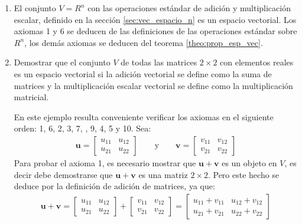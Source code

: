\documentclass[a4paper,12pt]{article}
\begin{document}
\begin{enumerate}[\textsc{Ejemplo} 1:, wide=\parindent]
  \item El conjunto $V=R^n$ con las operaciones estándar de adición y
    multiplicación escalar, definido en la sección \ref{sec:vec_espacio_n} es
    un espacio vectorial. Los axiomas 1 y 6 se deducen de las definiciones de
    las operaciones estándar sobre $R^n$, los demás axiomas se deducen del
    teorema \ref{theo:prop_esp_vec}.
  \item Demostrar que el conjunto $V$ de todas las matrices $2\times 2$ con
    elementos reales es un espacio vectorial si la adición vectorial se define
    como la suma de matrices y la multiplicación escalar vectorial se define
    como la multiplicación matricial.

    \sol En este ejemplo resulta conveniente verificar los axiomas en el
    siguiente orden: 1, 6, 2, 3, 7, , 9, 4, 5 y 10. Sea:
    \begin{align*}
      \mathbf{u}=
      \begin{bmatrix}
        u_{11} & u_{12} \\
        u_{21} & u_{22}
      \end{bmatrix}
      \qquad \mbox{y} \qquad
      \mathbf{v}=
      \begin{bmatrix}
        v_{11} & v_{12} \\
        v_{21} & v_{22}
      \end{bmatrix}
    \end{align*}
    Para probar el axioma 1, es necesario mostrar que $\mathbf{u}+\mathbf{v}$
    es un objeto en $V$, es decir debe demostrarse que $\mathbf{u}+\mathbf{v}$
    es una matriz $2\times 2$. Pero este hecho se deduce por la definición de
    adición de matrices, ya que:
    \begin{align*}
      \mathbf{u}+\mathbf{v}=
      \begin{bmatrix}
        u_{11} & u_{12} \\
        u_{21} & u_{22}
      \end{bmatrix}
      +
      \begin{bmatrix}
        v_{11} & v_{12} \\
        v_{21} & v_{22}
      \end{bmatrix}
      =
      \begin{bmatrix}
        u_{11} + v_{11} & u_{12} + v_{12}  \\
        u_{21} + v_{21} & u_{22} + v_{22} 
      \end{bmatrix}

\end{align*}
\end{enumerate}
\end{document}
